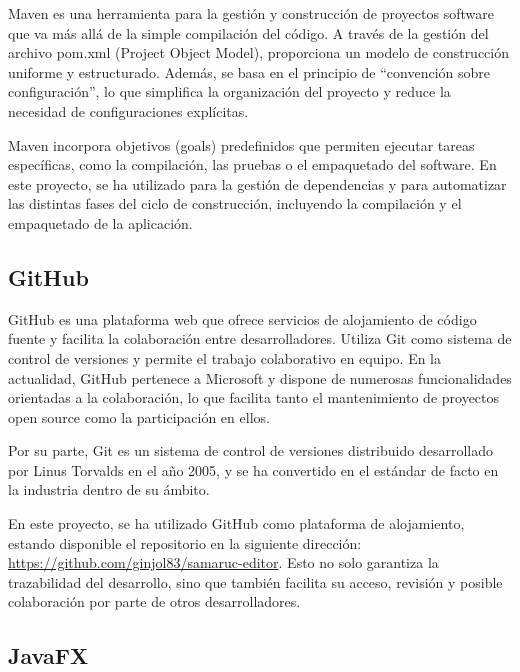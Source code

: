 \documentclass[../../main.tex]{subfiles}
\begin{document}
\par{Maven es una herramienta para la gestión y construcción de proyectos software que va más allá de la simple compilación del código. A través de la gestión del archivo pom.xml (Project Object Model), proporciona un modelo de construcción uniforme y estructurado. Además, se basa en el principio de “convención sobre configuración”, lo que simplifica la organización del proyecto y reduce la necesidad de configuraciones explícitas.}

\par{Maven incorpora objetivos (goals) predefinidos que permiten ejecutar tareas específicas, como la compilación, las pruebas o el empaquetado del software. En este proyecto, se ha utilizado para la gestión de dependencias y para automatizar las distintas fases del ciclo de construcción, incluyendo la compilación y el empaquetado de la aplicación.}

\subsection{GitHub}

\par{GitHub es una plataforma web que ofrece servicios de alojamiento de código fuente y facilita la colaboración entre desarrolladores. Utiliza Git como sistema de control de versiones y permite el trabajo colaborativo en equipo. En la actualidad, GitHub pertenece a Microsoft y dispone de numerosas funcionalidades orientadas a la colaboración, lo que facilita tanto el mantenimiento de proyectos open source como la participación en ellos.}

\par{Por su parte, Git es un sistema de control de versiones distribuido desarrollado por Linus Torvalds en el año 2005, y se ha convertido en el estándar de facto en la industria dentro de su ámbito.}

\par{En este proyecto, se ha utilizado GitHub como plataforma de alojamiento, estando disponible el repositorio en la siguiente dirección: \url{https://github.com/ginjol83/samaruc-editor}. Esto no solo garantiza la trazabilidad del desarrollo, sino que también facilita su acceso, revisión y posible colaboración por parte de otros desarrolladores.}

\subsection{JavaFX}
\end{document}
